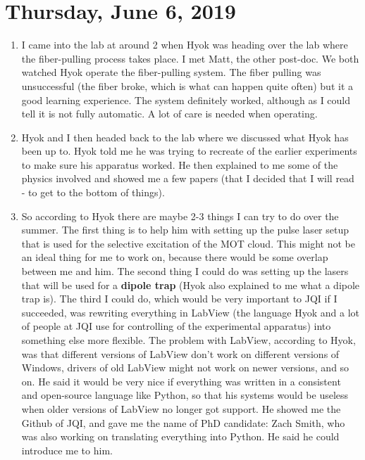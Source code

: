 \documentclass{report}
\theoremstyle{definition}
\begin{document}
\section{Thursday, June 6, 2019}
	\begin{enumerate}
	\item I came into the lab at around 2 when Hyok was heading over the lab where the fiber-pulling process takes place. I met Matt, the other post-doc. We both watched Hyok operate the fiber-pulling system. The fiber pulling was unsuccessful (the fiber broke, which is what can happen quite often) but it a good learning experience. The system definitely worked, although as I could tell it is not fully automatic. A lot of care is needed when operating.
	
	
	\item Hyok and I then headed back to the lab where we discussed what Hyok has been up to. Hyok told me he was trying to recreate of the earlier experiments to make sure his apparatus worked. He then explained to me some of the physics involved and showed me a few papers (that I decided that I will read - to get to the bottom of things). 
	
	
	\item So according to Hyok there are maybe 2-3 things I can try to do over the summer. The first thing is to help him with setting up the pulse laser setup that is used for the selective excitation of the MOT cloud. This might not be an ideal thing for me to work on, because there would be some overlap between me and him. The second thing I could do was setting up the lasers that will be used for a \textbf{dipole trap} (Hyok also explained to me what a dipole trap is). The third I could do, which would be very important to JQI if I succeeded, was rewriting everything in LabView (the language Hyok and a lot of people at JQI use for controlling of the experimental apparatus) into something else more flexible. The problem with LabView, according to Hyok, was that different versions of LabView don't work on different versions of Windows, drivers of old LabView might not work on newer versions, and so on. He said it would be very nice if everything was written in a consistent and open-source language like Python, so that his systems would be useless when older versions of LabView no longer got support. He showed me the Github of JQI, and gave me the name of PhD candidate: Zach Smith, who was also working on translating everything into Python. He said he could introduce me to him.
	

\end{enumerate}
\end{document}
